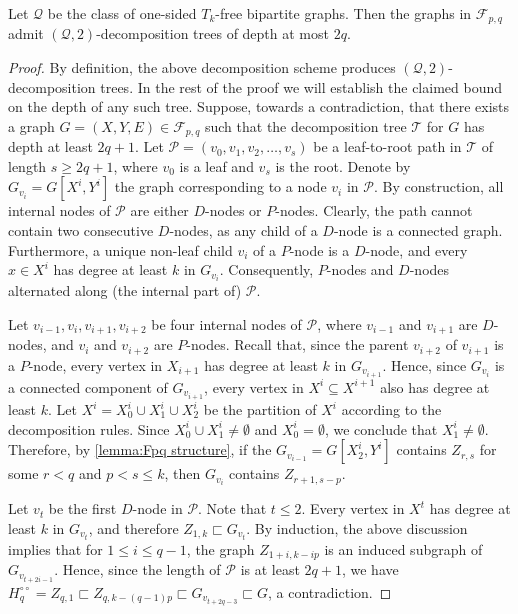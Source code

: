 \documentclass{article}
\newcommand{\cF}{\ensuremath{\mathcal{F}}}
\newcommand{\cP}{\ensuremath{\mathcal{P}}}
\newcommand{\cQ}{\ensuremath{\mathcal{Q}}}
\newcommand{\cT}{\ensuremath{\mathcal{T}}}
\begin{document}
\begin{proposition}\label{prop:Fpp-decomposition}
	Let $\cQ$ be the class of one-sided $T_k$-free bipartite graphs.
	Then the graphs in $\cF_{p,q}$ admit $(\cQ,2)$-decomposition trees of depth at most $2q$.
\end{proposition}
\begin{proof}
	By definition, the above decomposition scheme produces $(\cQ,2)$-decomposition trees. 
	In the rest of the proof we will establish the claimed bound on the depth of any such tree.
	Suppose, towards a contradiction, that there exists a graph $G=(X,Y,E) \in \cF_{p,q}$
	such that the decomposition tree $\cT$ for $G$ has depth at least $2q+1$.
	Let $\cP = (v_0,v_1, v_2, \ldots, v_s)$ be a leaf-to-root path in $\cT$ of length $s \geq 2q+1$, where
	$v_0$ is a leaf and $v_s$ is the root. Denote by $G_{v_i} = G[X^{i}, Y^{i}]$ the graph
	corresponding to a node $v_i$ in $\cP$.
	By construction, all internal nodes of $\cP$ are either $D$-nodes or $P$-nodes.
	Clearly, the path cannot contain two consecutive $D$-nodes, as any child of a $D$-node
	is a connected graph.
	Furthermore, a unique non-leaf child $v_i$ of a $P$-node is a $D$-node, 
	and every $x \in X^{i}$ has degree at least $k$ in $G_{v_i}$. 
	Consequently, $P$-nodes and $D$-nodes alternated along (the internal part of) $\cP$. 
	
	Let $v_{i-1}, v_i, v_{i+1}, v_{i+2}$ be four internal nodes of $\cP$,
	where $v_{i-1}$ and $v_{i+1}$ are $D$-nodes, and $v_i$ and $v_{i+2}$ are $P$-nodes.
	Recall that, since the parent $v_{i+2}$ of $v_{i+1}$ is a $P$-node, every vertex in $X_{i+1}$ has degree at least $k$ in $G_{v_{i+1}}$.
	Hence, since $G_{v_i}$ is a connected component of $G_{v_{i+1}}$, every vertex in $X^{i} \subseteq X^{i+1}$ also has degree at least $k$.
	Let $X^{i} = X^{i}_0 \cup X^{i}_1 \cup X^{i}_2$ be the partition of $X^{i}$ according to the decomposition rules. Since $X^{i}_0 \cup X^{i}_1 \neq \emptyset$ and $X^i_0 = \emptyset$, we conclude that $X^{i}_1 \neq \emptyset$. Therefore, by \cref{lemma:Fpq structure}, if the $G_{v_{i-1}} = G[X^{i}_2, Y^i]$ contains $Z_{r,s}$ for some $r < q$ and $p < s \leq k$, then $G_{v_i}$ contains $Z_{r+1, s-p}$.
	
	Let $v_t$ be the first $D$-node in $\cP$. Note that $t \leq 2$. Every vertex in $X^t$ has degree at least $k$
	in $G_{v_t}$, and therefore $Z_{1,k} \sqsubset G_{v_t}$. By induction, the above discussion implies that
	for $1 \leq i \leq q-1$, the graph $Z_{1+i,k-ip}$ is an induced subgraph of $G_{v_{t+2i-1}}$.
	Hence, since the length of $\cP$ is at least $2q+1$, we have $H^{\circ\circ}_q = Z_{q,1} \sqsubset Z_{q,k-(q-1)p} \sqsubset G_{v_{t+2q-3}} \sqsubset G$, a contradiction.
\end{proof}
\end{document}
